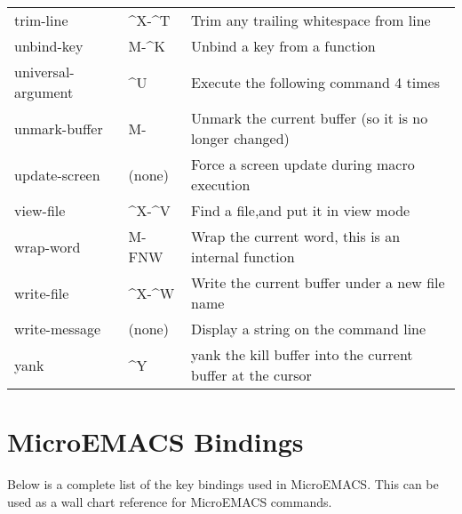 \begin{tabular}{llp{300pt}}
trim-line &  \^{}X-\^{}T & Trim any trailing whitespace from line\\

unbind-key &  M-\^{}K & Unbind a key from a function\\

universal-argument &  \^{}U & Execute the following command 4 times\\

unmark-buffer &  M-~ & Unmark the current buffer (so it is
no longer changed)\\

update-screen & (none) & Force a screen update during macro execution\\

view-file &  \^{}X-\^{}V & Find a file,and put it in view mode\\

wrap-word &  M-FNW & Wrap the current word, this is an
internal function\\

write-file &  \^{}X-\^{}W & Write the current buffer under a new
file name\\

write-message & (none) & Display a string on the command line\\

yank &  \^{}Y & yank the kill buffer into the current
buffer at the cursor\\
\end{tabular}
\chapter{MicroEMACS Bindings}

Below is a complete list of the key bindings used in MicroEMACS.
This can be used as a wall chart reference for MicroEMACS commands.

